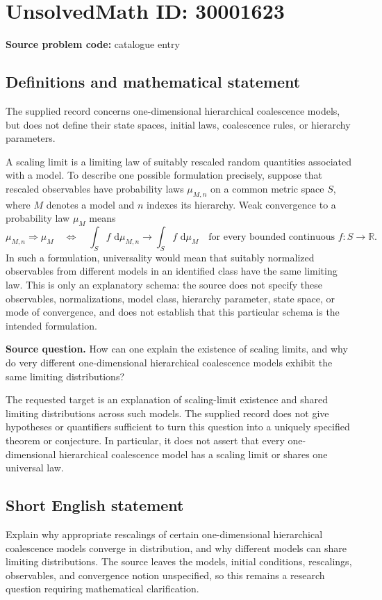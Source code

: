 \documentclass[11pt]{article}
\newcommand{\R}{\mathbb{R}}
\newcommand{\dd}{\,\mathrm{d}}
\begin{document}
\section*{UnsolvedMath ID: 30001623}
\textbf{Source problem code:} catalogue entry
\subsection{Definitions and mathematical statement}
The supplied record concerns one-dimensional hierarchical coalescence models, but does not define their state spaces, initial laws, coalescence rules, or hierarchy parameters.

A scaling limit is a limiting law of suitably rescaled random quantities associated with a model. To describe one possible formulation precisely, suppose that rescaled observables have probability laws \(\mu_{M,n}\) on a common metric space \(S\), where \(M\) denotes a model and \(n\) indexes its hierarchy. Weak convergence to a probability law \(\mu_M\) means
\[
\mu_{M,n}\Rightarrow\mu_M
\quad\Longleftrightarrow\quad
\int_S f\,\dd\mu_{M,n}\longrightarrow\int_S f\,\dd\mu_M
\quad\text{for every bounded continuous }f:S\to\R.
\]
In such a formulation, universality would mean that suitably normalized observables from different models in an identified class have the same limiting law. This is only an explanatory schema: the source does not specify these observables, normalizations, model class, hierarchy parameter, state space, or mode of convergence, and does not establish that this particular schema is the intended formulation.

\textbf{Source question.} How can one explain the existence of scaling limits, and why do very different one-dimensional hierarchical coalescence models exhibit the same limiting distributions?

The requested target is an explanation of scaling-limit existence and shared limiting distributions across such models. The supplied record does not give hypotheses or quantifiers sufficient to turn this question into a uniquely specified theorem or conjecture. In particular, it does not assert that every one-dimensional hierarchical coalescence model has a scaling limit or shares one universal law.
\subsection{Short English statement}
Explain why appropriate rescalings of certain one-dimensional hierarchical coalescence models converge in distribution, and why different models can share limiting distributions. The source leaves the models, initial conditions, rescalings, observables, and convergence notion unspecified, so this remains a research question requiring mathematical clarification.
\end{document}

